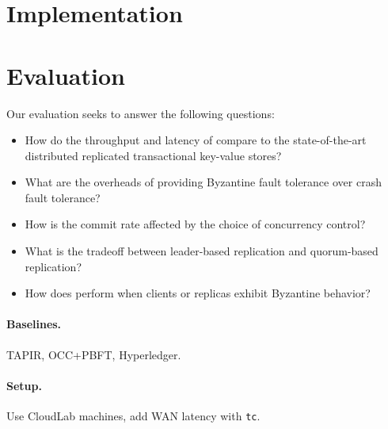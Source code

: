 \section{Implementation}

\section{Evaluation}

Our evaluation seeks to answer the following questions:
\begin{itemize}
  \item How do the throughput and latency of \sys{} compare to the
    state-of-the-art distributed replicated transactional key-value
    stores?
  \item What are the overheads of providing Byzantine fault tolerance over
    crash fault tolerance?
  \item How is the commit rate affected by the choice of concurrency control?
  \item What is the tradeoff between leader-based replication and quorum-based
    replication?
  \item How does \sys{} perform when clients or replicas exhibit Byzantine
    behavior?
\end{itemize}

\paragraph{Baselines.} TAPIR, OCC+PBFT, Hyperledger.
\paragraph{Setup.} Use CloudLab machines, add WAN latency with \texttt{tc}.
